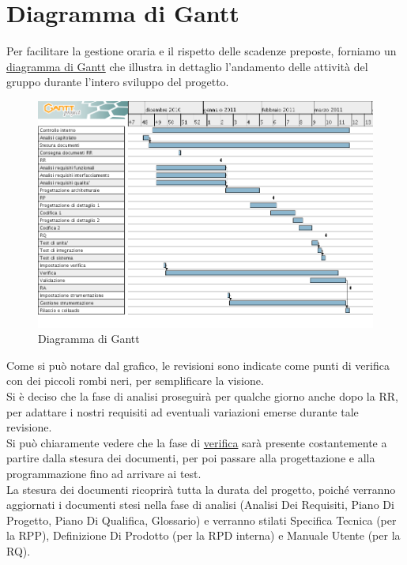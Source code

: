 \section{Diagramma di Gantt}
Per facilitare la gestione oraria e il rispetto delle scadenze preposte,
forniamo un \underline{diagramma di Gantt} che illustra in dettaglio l'andamento
delle attivit\`a del gruppo durante l'intero sviluppo del progetto.
\vspace{0.8cm}
\begin{figure}[htbp]
  \centering
  \includegraphics[width=17.2cm, angle=0]{img/PP/gantt1.png}
\caption{Diagramma di Gantt}
\end{figure}
\newpage

Come si pu\`o notare dal grafico, le revisioni sono indicate come punti di 
verifica con dei piccoli rombi neri, per semplificare la visione.\\
Si \`e deciso che la fase di analisi proseguir\`a per qualche giorno anche dopo
la RR, per adattare i nostri requisiti ad eventuali variazioni emerse durante
tale revisione.\\

Si pu\`o chiaramente vedere che la fase di \underline{verifica} sar\`a presente
costantemente a partire dalla stesura dei documenti, per poi passare alla progettazione e alla
programmazione fino ad arrivare ai test.\\

La stesura dei documenti ricoprir\`a tutta la durata del progetto, poich\'e
verranno aggiornati i documenti stesi nella fase di analisi (Analisi Dei
Requisiti, Piano Di Progetto, Piano Di Qualifica, Glossario) e verranno stilati
Specifica Tecnica (per la RPP), Definizione Di Prodotto (per la RPD interna) e
Manuale Utente (per la RQ).

